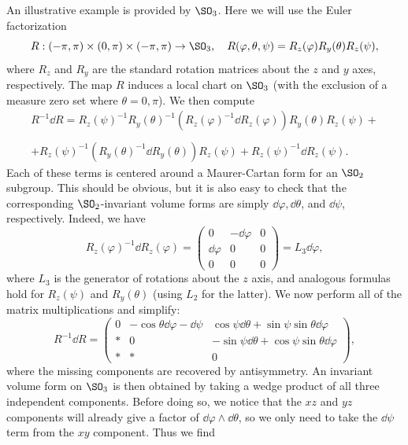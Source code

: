 \begin{example}\label{ex SO3 Haar measure}
    An illustrative example is provided by $\SO_3$. Here we will use the Euler factorization
    \[R:(-\pi,\pi)\times(0,\pi)\times(-\pi,\pi)\to \SO_3,\quad R(\varphi,\theta,\psi)=R_z(\varphi)R_y(\theta)R_z(\psi),\]
    where $R_z$ and $R_y$ are the standard rotation matrices about the $z$ and $y$ axes, respectively. The map $R$ induces a local chart on $\SO_3$ (with the exclusion of a measure zero set where $\theta=0,\pi$). We then compute
    \begin{multline}
        R^{-1}\dd R=R_z(\psi)^{-1}R_y(\theta)^{-1}\left(R_z(\varphi)^{-1}\dd R_z(\varphi)\right)R_y(\theta)R_z(\psi)+\\
        \\+R_z(\psi)^{-1}\left(R_y(\theta)^{-1}\dd R_y(\theta)\right)R_z(\psi)+
        R_z(\psi)^{-1}\dd R_z(\psi).
    \end{multline}
    Each of these terms is centered around a Maurer-Cartan form for an $\SO_2$ subgroup. This should be obvious, but it is also easy to check that the corresponding $\SO_2$-invariant volume forms are simply $\dd\varphi, \dd\theta$, and $\dd\psi$, respectively. Indeed, we have
    \[R_z(\varphi)^{-1}\dd R_z(\varphi)=\begin{pmatrix}
        0&-\dd\varphi&0\\
        \dd\varphi&0&0\\
        0&0&0
    \end{pmatrix}=L_3\dd\varphi,\]
    where $L_3$ is the generator of rotations about the $z$ axis, and  analogous formulas hold for $R_z(\psi)$ and $R_y(\theta)$ (using $L_2$ for the latter). We now perform all of the matrix multiplications and simplify:
    \[R^{-1}\dd R=\begin{pmatrix}
        0& -\cos\theta\dd\varphi-\dd\psi& \cos\psi\dd\theta+\sin\psi\sin\theta\dd\varphi\\
        \ast & 0 & -\sin\psi\dd\theta+\cos\psi\sin\theta\dd\varphi\\
        \ast & \ast & 0
    \end{pmatrix},\]
    where the missing components are recovered by antisymmetry. An invariant volume form on $\SO_3$ is then obtained by taking a wedge product of all three independent components. Before doing so, we notice that the $xz$ and $yz$ components will already give a factor of $\dd\varphi\wedge\dd\theta$, so we only need to take the $\dd\psi$ term from the $xy$ component. Thus we find
    \begin{multline}

\end{multline}
\end{example}
